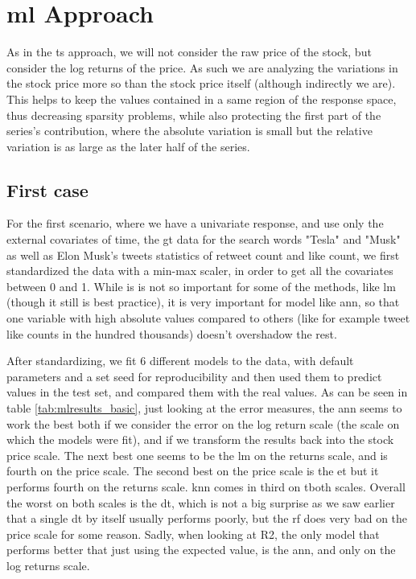 \section{\acrlong{ml} Approach}
As in the \acrshort{ts} approach, we will not consider the raw price of the stock, but consider the log returns of the price. As such we are analyzing the variations in the stock price more so than the stock price itself (although indirectly we are). This helps to keep the values contained in a same region of the response space, thus decreasing sparsity problems, while also protecting the first part of the series's contribution, where the absolute variation is small but the relative variation is as large as the later half of the series.

\subsection{First case}

For the first scenario,  where we have a univariate response, and use only the external covariates of time, the \acrlong{gt} data for the search words "Tesla" and "Musk" as well as Elon Musk's tweets statistics of retweet count and like count, we first standardized the data with a min-max scaler, in order to get all the covariates between 0 and 1. While is is not so important for some of the methods, like \acrlong{lm} (though it still is best practice), it is very important for model like \acrshort{ann}, so that one variable with high absolute values compared to others (like for example tweet like counts in the hundred thousands) doesn't overshadow the rest.



After standardizing, we fit 6 different models to the data, with default parameters and a set seed for reproducibility and then used them to predict values in the test set, and compared them with the real values. As can be seen in table \ref{tab:mlresults_basic}, just looking at the error measures, the \acrlong{ann} seems to work the best both if we consider the error on the log return scale (the scale on which the models were fit), and if we transform the results back into the stock price scale. The next best one seems to be the \acrlong{lm} on the returns scale, and is fourth on the price scale. The second best on the price scale is the \acrlong{et}  but it performs fourth on the returns scale.  \acrshort{knn} comes in third on tboth scales. Overall the worst on both scales is the \acrlong{dt}, which is not a big surprise as we saw earlier that a single \acrshort{dt} by itself usually performs poorly, but the \acrlong{rf} does very bad on the price scale for some reason. Sadly, when looking at \Gls{R2}, the only model that performs better that just using the expected value, is the \acrlong{ann}, and only on the log returns scale. 

